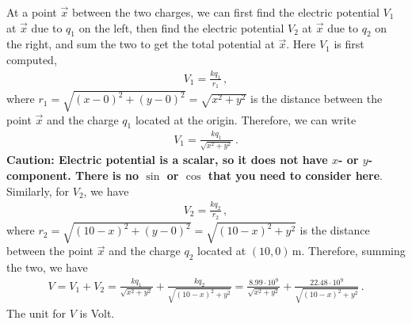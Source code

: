 \documentclass[11pt]{article}
\begin{document}
At a point $\vec{x}$ between the two charges, we can first find the electric potential $V_1$ at $\vec{x}$ due to $q_1$ on the left, then find the electric potential $V_2$ at $\vec{x}$ due to $q_2$ on the right, and sum the two to get the total potential at $\vec{x}$. Here $V_1$ is first computed, 
\begin{align*}
V_1 = \frac{kq_1}{r_1}\,,
\end{align*}
where $r_1 = \sqrt{(x-0)^2 + (y-0)^2} = \sqrt{x^2+y^2}$ is the distance between the point $\vec{x}$ and the charge $q_1$ located at the origin. Therefore, we can write
\begin{align*}
V_1 = \frac{kq_1}{\sqrt{x^2 + y^2}}\,.
\end{align*}
\textbf{Caution: Electric potential is a scalar, so it does not have $x$- or $y$-component. There is no $\sin$ or $\cos$ that you need to consider here}. Similarly, for $V_2$, we have
\begin{align*}
V_2 = \frac{kq_2}{r_2}\,,
\end{align*}
where $r_2 = \sqrt{(10-x)^2 + (y-0)^2} = \sqrt{(10-x)^2 + y^2}$ is the distance between the point $\vec{x}$ and the charge $q_2$ located at $(10,0)$\,m. Therefore, summing the two, we have
\begin{align*}
V = V_1 + V_2 = \frac{kq_1}{\sqrt{x^2+y^2}}+ \frac{kq_2}{\sqrt{(10-x)^2+y^2}}=
\frac{8.99 \cdot 10^9}{\sqrt{x^2+y^2}}+ \frac{22.48 \cdot 10^9}{\sqrt{(10-x)^2+y^2}}\,.
\end{align*}
The unit for $V$ is Volt.\\
\end{document}
